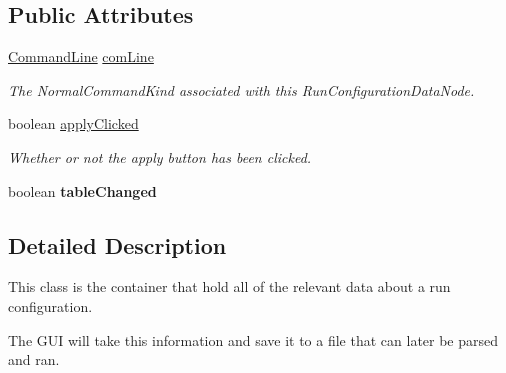 \subsection*{Public Attributes}
\begin{DoxyCompactItemize}
\item 
\hypertarget{classedu_1_1udel_1_1cis_1_1vsl_1_1civl_1_1gui_1_1common_1_1RunConfigDataNode_a01d188ef90f00c0195c88dbf9c2d5891}{}\hyperlink{interfaceedu_1_1udel_1_1cis_1_1vsl_1_1civl_1_1run_1_1IF_1_1CommandLine}{Command\+Line} \hyperlink{classedu_1_1udel_1_1cis_1_1vsl_1_1civl_1_1gui_1_1common_1_1RunConfigDataNode_a01d188ef90f00c0195c88dbf9c2d5891}{com\+Line}\label{classedu_1_1udel_1_1cis_1_1vsl_1_1civl_1_1gui_1_1common_1_1RunConfigDataNode_a01d188ef90f00c0195c88dbf9c2d5891}

\begin{DoxyCompactList}\small\item\em The Normal\+Command\+Kind associated with this Run\+Configuration\+Data\+Node. \end{DoxyCompactList}\item 
\hypertarget{classedu_1_1udel_1_1cis_1_1vsl_1_1civl_1_1gui_1_1common_1_1RunConfigDataNode_acbcf5da45a16b8ef5e04b9c2ad1d3ca0}{}boolean \hyperlink{classedu_1_1udel_1_1cis_1_1vsl_1_1civl_1_1gui_1_1common_1_1RunConfigDataNode_acbcf5da45a16b8ef5e04b9c2ad1d3ca0}{apply\+Clicked}\label{classedu_1_1udel_1_1cis_1_1vsl_1_1civl_1_1gui_1_1common_1_1RunConfigDataNode_acbcf5da45a16b8ef5e04b9c2ad1d3ca0}

\begin{DoxyCompactList}\small\item\em Whether or not the apply button has been clicked. \end{DoxyCompactList}\item 
\hypertarget{classedu_1_1udel_1_1cis_1_1vsl_1_1civl_1_1gui_1_1common_1_1RunConfigDataNode_a28c61818053d8f7d054ab9491e58e476}{}boolean {\bfseries table\+Changed}\label{classedu_1_1udel_1_1cis_1_1vsl_1_1civl_1_1gui_1_1common_1_1RunConfigDataNode_a28c61818053d8f7d054ab9491e58e476}

\end{DoxyCompactItemize}


\subsection{Detailed Description}
This class is the container that hold all of the relevant data about a run configuration. 

The G\+U\+I will take this information and save it to a file that can later be parsed and ran.

